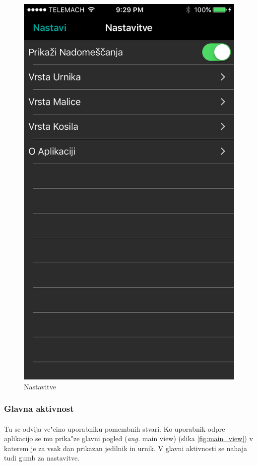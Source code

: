 \begin{figure}[!h]
\begin{minipage}{0.45\linewidth}
		\includegraphics[width=\linewidth]{images/nastavitve.png}
		\caption{Nastavitve}\label{fig:settings}
	\end{minipage}
\end{figure}

\subsubsection{Glavna aktivnost}
\paragraph{}Tu se odvija ve"cino uporabniku pomembnih stvari. Ko uporabnik odpre aplikacijo se mu prika"ze glavni pogled (\textit{ang.} main view) (slika \ref{fig:main_view}) v katerem je za vsak dan prikazan jedilnik in urnik. V glavni aktivnosti se nahaja tudi gumb za nastavitve.

